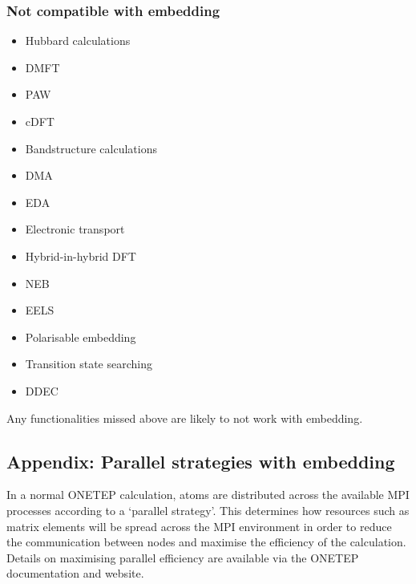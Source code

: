 \documentclass[letterpaper,10pt,english]{sphinxmanual}
\begin{document}
\subsubsection{Not compatible with embedding}
\label{\detokenize{EMFT_in_ONETEP:not-compatible-with-embedding}}\begin{itemize}
\item {} 
Hubbard calculations

\item {} 
DMFT

\item {} 
PAW

\item {} 
cDFT

\item {} 
Bandstructure calculations

\item {} 
DMA

\item {} 
EDA

\item {} 
Electronic transport

\item {} 
Hybrid-in-hybrid DFT

\item {} 
NEB

\item {} 
EELS

\item {} 
Polarisable embedding

\item {} 
Transition state searching

\item {} 
DDEC

\end{itemize}

Any functionalities missed above are likely to not work with embedding.


\subsection{Appendix: Parallel strategies with embedding}
\label{\detokenize{EMFT_in_ONETEP:appendix-parallel-strategies-with-embedding}}
In a normal ONETEP calculation, atoms are distributed across the
available MPI processes according to a ‘parallel strategy’. This
determines how resources such as matrix elements will be spread across
the MPI environment in order to reduce the communication between nodes
and maximise the efficiency of the calculation. Details on maximising
parallel efficiency are available via the ONETEP documentation and
website.
\end{document}
